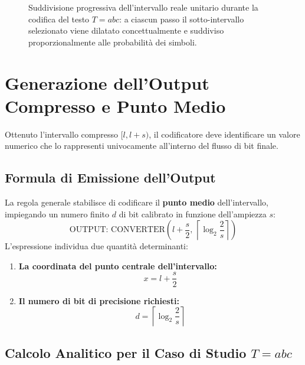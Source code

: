 \begin{figure}[H]
\begin{tikzpicture}[
    scale=0.84,
    every node/.style={transform shape}
]
\end{tikzpicture}
\caption{Suddivisione progressiva dell'intervallo reale unitario durante la codifica del testo $T = abc$: a ciascun passo il sotto-intervallo selezionato viene dilatato concettualmente e suddiviso proporzionalmente alle probabilit\`a dei simboli.}
\label{fig:suddivisione-intervalli-aritmetica}
\end{figure}

\FloatBarrier
\section[Generazione dell'Output e Punto Medio]{Generazione dell'Output\\Compresso e Punto Medio}
\label{sec:generazione-output-punto-medio}

Ottenuto l'intervallo compresso $[l, l + s)$, il codificatore deve identificare un valore numerico che lo rappresenti univocamente all'interno del flusso di bit finale.

\FloatBarrier
\subsection{Formula di Emissione dell'Output}
\label{subsec:formula-emissione-output}

La regola generale stabilisce di codificare il \textbf{punto medio} dell'intervallo, impiegando un numero finito $d$ di bit calibrato in funzione dell'ampiezza $s$:
\begin{equation}
  \text{OUTPUT: CONVERTER}\left(l + \frac{s}{2}, \, \left\lceil \log_2 \frac{2}{s} \right\rceil\right)
\end{equation}
L'espressione individua due quantit\`a determinanti:
\begin{enumerate}
  \item \textbf{La coordinata del punto centrale dell'intervallo:}
  \begin{equation}
    x = l + \frac{s}{2}
  \end{equation}
  \item \textbf{Il numero di bit di precisione richiesti:}
  \begin{equation}
    d = \left\lceil \log_2 \frac{2}{s} \right\rceil
  \end{equation}
\end{enumerate}

\FloatBarrier
\subsection{Calcolo Analitico per il Caso di Studio $T = abc$}
\label{subsec:calcolo-caso-studio-abc}

